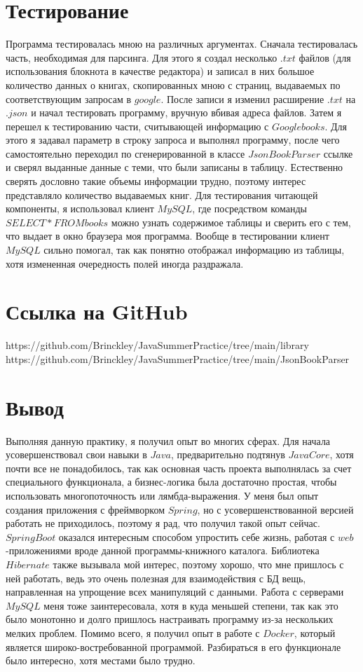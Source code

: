 \section*{Тестирование}
Программа тестировалась мною на различных аргументах. Сначала тестировалась часть, необходимая для парсинга. Для этого я создал несколько $.txt$ файлов (для использования блокнота в качестве редактора) и записал в них большое количество данных о книгах, скопированных мною с страниц, выдаваемых по соответствующим запросам в $google$. После записи я изменил расширение $.txt$ на $.json$ и начал тестировать программу, вручную вбивая адреса файлов. Затем я перешел к тестированию части, считывающей информацию с $Google books$. Для этого я задавал параметр в строку запроса и выполнял программу, после чего самостоятельно переходил по сгенерированной в классе $JsonBookParser$ ссылке и сверял выданные данные с теми, что были записаны в таблицу. Естественно сверять дословно такие объемы информации трудно, поэтому интерес представляло количество выдаваемых книг.
\newline Для тестирования читающей компоненты, я использовал клиент $MySQL$, где посредством команды $SELECT * FROM books$ можно узнать содержимое таблицы и сверить его с тем, что выдает в окно браузера моя программа. Вообще в тестировании клиент $MySQL$ сильно помогал, так как понятно отображал информацию из таблицы, хотя измененная очередность полей иногда раздражала.  
\section*{Ссылка на GitHub}
https://github.com/Brinckley/JavaSummerPractice/tree/main/library
https://github.com/Brinckley/JavaSummerPractice/tree/main/JsonBookParser
\section*{Вывод}
Выполняя данную практику, я получил опыт во многих сферах. Для начала усовершенствовал свои навыки в $Java$, предварительно подтянув $Java Core$, хотя почти все не понадобилось, так как основная часть проекта выполнялась за счет специального функционала, а бизнес-логика была достаточно простая, чтобы использовать многопоточность или лямбда-выражения. У меня был опыт создания приложения с фреймворком $Spring$, но с усовершенствованной версией работать не приходилось, поэтому я рад, что получил такой опыт сейчас. $Spring Boot$ оказался интересным способом упростить себе жизнь, работая с $web$-приложениями вроде данной программы-книжного каталога. Библиотека $Hibernate$ также вызывала мой интерес, поэтому хорошо, что мне пришлось с ней работать, ведь это очень полезная для взаимодействия с БД вещь, направленная на упрощение всех манипуляций с данными. Работа с серверами $MySQL$ меня тоже заинтересовала, хотя в куда меньшей степени, так как это было монотонно и долго пришлось настраивать программу из-за нескольких мелких проблем. Помимо всего, я получил опыт в работе с $Docker$, который является широко-востребованной программой. Разбираться в его функционале было интересно, хотя местами было трудно.
\pagebreak

